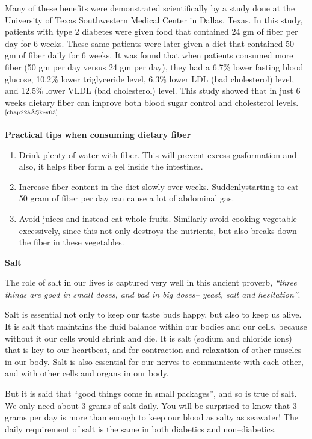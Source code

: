 Many of these benefits were demonstrated scientifically by a study done at the University of Texas Southwestern Medical Center in Dallas, Texas. In this study, patients with type 2 diabetes were given food that contained 24 gm of fiber per day for 6 weeks. These same patients were later given a diet that contained 50 gm of fiber daily for 6 weeks. It was found that when patients consumed more fiber (50 gm per day versus 24 gm per day), they had a 6.7\% lower fasting blood glucose, 10.2\% lower triglyceride level, 6.3\% lower LDL (bad cholesterol) level, and 12.5\% lower VLDL (bad cholesterol) level. This study showed that in just 6 weeks dietary fiber can improve both blood sugar control and cholesterol levels.$^{\text{\cite{chap22–key03}}}$

\noindent\textbf{Practical tips when consuming dietary fiber}

\begin{enumerate}[•]
\itemsep=0pt
\item Drink plenty of water with fiber. This will prevent excess gas\break formation and also, it helps fiber form a gel inside the intestines.
\item Increase fiber content in the diet slowly over weeks. Suddenly\break starting to eat 50 gram of fiber per day can cause a lot of abdominal gas.
\item Avoid juices and instead eat whole fruits. Similarly avoid cooking vegetable excessively, since this not only destroys the nutrients, but also breaks down the fiber in these vegetables.
\end{enumerate}

\noindent\textbf{Salt}

The role of salt in our lives is captured very well in this ancient proverb, \textit{“three things are good in small doses, and bad in big doses– yeast, salt and hesitation”}.

Salt is essential not only to keep our taste buds happy, but also to keep us alive. It is salt that maintains the fluid balance within our bodies and our cells, because without it our cells would shrink and die. It is salt (sodium and chloride ions) that is key to our heartbeat, and for contraction and relaxation of other muscles in our body. Salt is also essential for our nerves to communicate with each other, and with other cells and organs in our body.

But it is said that “good things come in small packages”, and so is true of salt. We only need about 3 grams of salt daily. You will be surprised to know that 3 grams per day is more than enough to keep our blood as salty as seawater! The daily requirement of salt is the same in both diabetics and non–diabetics.

